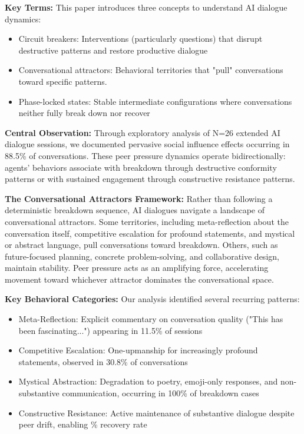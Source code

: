 \documentclass[11pt,letterpaper]{article}
\newcommand{\exponedataTotalSessionsRaw}{26}
\newcommand{\exponedataRecoverySessionsRaw}{9}
\newcommand{\exponedataTotalSessions}{N=\exponedataTotalSessionsRaw}
\newcommand{\exponedataRecoveryPercentage}{%
  \fpeval{round(\exponedataRecoverySessionsRaw / \exponedataTotalSessionsRaw * 100, 1)}\%
}
\newcommand{\exponedataPeerPressurePercentage}{88.5\%}
\newcommand{\exponedataMetaReflectionTriggers}{11.5\%}
\newcommand{\exponedataCompetitiveEscalationPercentage}{30.8\%}
\newcommand{\exponedataMysticalBreakdownInBreakdowns}{100\%}
\begin{document}
\textbf{Key Terms:} This paper introduces three concepts to understand AI dialogue dynamics:
\begin{itemize}
    \item Circuit breakers: Interventions (particularly questions) that disrupt destructive patterns and restore productive dialogue
    \item Conversational attractors: Behavioral territories that "pull" conversations toward specific patterns. 
    \item Phase-locked states: Stable intermediate configurations where conversations neither fully break down nor recover
\end{itemize}

\textbf{Central Observation:} Through exploratory analysis of \exponedataTotalSessions{} extended AI dialogue sessions, we documented pervasive social influence effects occurring in \exponedataPeerPressurePercentage{} of conversations. These peer pressure dynamics operate bidirectionally: agents' behaviors associate with breakdown through destructive conformity patterns or with sustained engagement through constructive resistance patterns.

\textbf{The Conversational Attractors Framework:} Rather than following a deterministic breakdown sequence, AI dialogues navigate a landscape of conversational attractors. Some territories, including meta-reflection about the conversation itself, competitive escalation for profound statements, and mystical or abstract language, pull conversations toward breakdown. Others, such as future-focused planning, concrete problem-solving, and collaborative design, maintain stability. Peer pressure acts as an amplifying force, accelerating movement toward whichever attractor dominates the conversational space.

\textbf{Key Behavioral Categories:} Our analysis identified several recurring patterns:
\begin{itemize}
    \item Meta-Reflection: Explicit commentary on conversation quality ("This has been fascinating...") appearing in \exponedataMetaReflectionTriggers{} of sessions
    \item Competitive Escalation: One-upmanship for increasingly profound statements, observed in \exponedataCompetitiveEscalationPercentage{} of conversations
    \item Mystical Abstraction: Degradation to poetry, emoji-only responses, and non-substantive communication, occurring in \exponedataMysticalBreakdownInBreakdowns{} of breakdown cases
    \item Constructive Resistance: Active maintenance of substantive dialogue despite peer drift, enabling \exponedataRecoveryPercentage{} recovery rate
\end{itemize}
\end{document}
